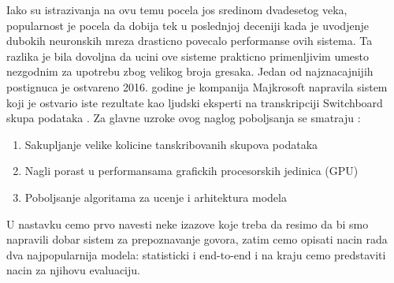 \documentclass[a4paper]{article}
\begin{document}
Iako su istrazivanja na ovu temu pocela jos sredinom dvadesetog veka, popularnost je pocela da dobija tek u poslednjoj deceniji kada je uvodjenje dubokih neuronskih mreza drasticno povecalo performanse ovih sistema.
Ta razlika je bila dovoljna da ucini ove sisteme prakticno primenljivim umesto nezgodnim za upotrebu zbog velikog broja gresaka.
Jedan od najznacajnijih postignuca je ostvareno 2016. godine je kompanija Majkrosoft napravila sistem koji je ostvario iste rezultate kao ljudski eksperti na transkripciji Switchboard skupa podataka \cite{switchboard}.
Za glavne uzroke ovog naglog poboljsanja se smatraju \cite{hannun2021history}:
\begin{enumerate}
  \item Sakupljanje velike kolicine tanskribovanih skupova podataka
  \item Nagli porast u performansama grafickih procesorskih jedinica (GPU)
  \item Poboljsanje algoritama za ucenje i arhitektura modela
\end{enumerate}

U nastavku cemo prvo navesti neke izazove koje treba da resimo da bi smo napravili dobar sistem za prepoznavanje govora, zatim cemo opisati nacin rada dva najpopularnija modela: statisticki i end-to-end i na kraju cemo predstaviti nacin za njihovu evaluaciju.
\end{document}
